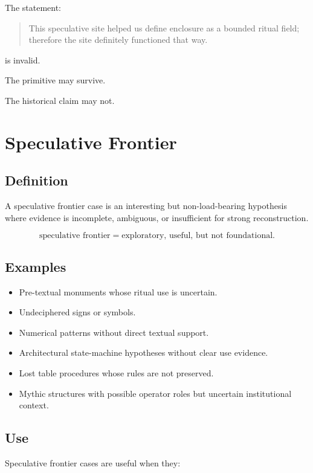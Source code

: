 \documentclass[11pt]{book}
\begin{document}
The statement:

\begin{quote}
This speculative site helped us define enclosure as a bounded ritual field; therefore the site definitely functioned that way.
\end{quote}

is invalid.

The primitive may survive.

The historical claim may not.

\section{Speculative Frontier}

\subsection{Definition}

A speculative frontier case is an interesting but non-load-bearing hypothesis where evidence is incomplete, ambiguous, or insufficient for strong reconstruction.

\[
\text{speculative frontier} = \text{exploratory, useful, but not foundational}.
\]

\subsection{Examples}

\begin{itemize}
    \item Pre-textual monuments whose ritual use is uncertain.
    \item Undeciphered signs or symbols.
    \item Numerical patterns without direct textual support.
    \item Architectural state-machine hypotheses without clear use evidence.
    \item Lost table procedures whose rules are not preserved.
    \item Mythic structures with possible operator roles but uncertain institutional context.
\end{itemize}

\subsection{Use}

Speculative frontier cases are useful when they:
\end{document}
